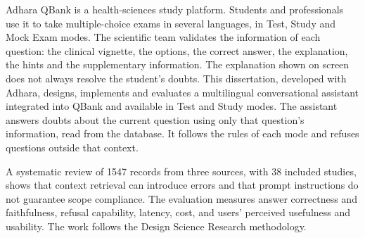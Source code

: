 \begin{abstractotherlanguage}


Adhara QBank is a health-sciences study platform. Students and professionals use it to take multiple-choice exams in several languages, in Test, Study and Mock Exam modes. The scientific team validates the information of each question: the clinical vignette, the options, the correct answer, the explanation, the hints and the supplementary information. The explanation shown on screen does not always resolve the student's doubts. This dissertation, developed with Adhara, designs, implements and evaluates a multilingual conversational assistant integrated into QBank and available in Test and Study modes. The assistant answers doubts about the current question using only that question's information, read from the database. It follows the rules of each mode and refuses questions outside that context.

A systematic review of 1547 records from three sources, with 38 included studies, shows that context retrieval can introduce errors and that prompt instructions do not guarantee scope compliance. The evaluation measures answer correctness and faithfulness, refusal capability, latency, cost, and users' perceived usefulness and usability. The work follows the Design Science Research methodology.


\end{abstractotherlanguage}


\begin{acknowledgements}


\end{acknowledgements}


\tableofcontents %

